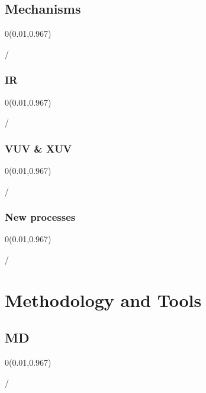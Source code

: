 \documentclass{beamer}
\makeatletter
\newcommand{\framenumber}{
\begin{textblock}{0}(0.01,0.967)
\begin{scriptsize}
{\color{gray}\insertframenumber/\inserttotalframenumber}
\end{scriptsize}
\end{textblock}
}
\makeatother
\begin{document}
\subsection{Mechanisms}
\begin{frame}{}\framenumber
\end{frame}

\subsubsection{IR}
\begin{frame}{}\framenumber
\end{frame}

\subsubsection{VUV \& XUV}
\begin{frame}{}\framenumber
\end{frame}

\subsubsection{New processes}
\begin{frame}{}\framenumber
\end{frame}


\section{Methodology and Tools}

\subsection{MD}
\begin{frame}{}\framenumber
\end{frame}
\end{document}
